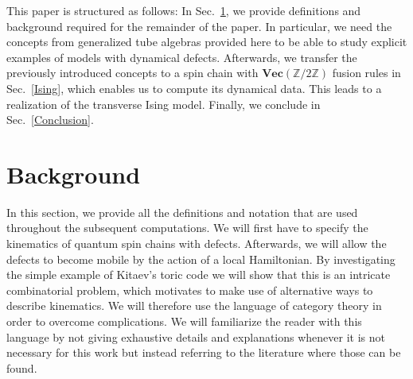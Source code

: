 \documentclass[aps,prb,twocolumn,superscriptaddress,noshowkeys]{revtex4-2}  %
\renewcommand{\Vec}{\textbf{Vec}}
\newcommand{\Z}{\mathbb{Z}}
\theoremstyle{plain}%
\theoremstyle{definition}
\theoremstyle{remark}
\begin{document}

This paper is structured as follows: In Sec.~\ref{S:defs}, we provide definitions and background required for the remainder of the paper. In particular, we need the concepts from generalized tube algebras provided here to be able to study explicit examples of models with dynamical defects. Afterwards, we transfer the previously introduced concepts to a spin chain with $\Vec(\Z/2\Z)$ fusion rules in Sec.~\ref{Ising}, which enables us to compute its dynamical data. This leads to a realization of the transverse Ising model. Finally, we conclude in Sec.~\ref{Conclusion}.

\section{Background}\label{S:defs}
In this section, we provide all the definitions and notation that are used throughout the subsequent computations. We will first have to specify the kinematics of quantum spin chains with defects. Afterwards, we will allow the defects to become mobile by the action of a local Hamiltonian. By investigating the simple example of Kitaev's toric code \cite{Kit03} we will show that this is an intricate combinatorial problem, which motivates to make use of alternative ways to describe kinematics. We will therefore use the language of category theory in order to overcome complications. We will familiarize the reader with this language by not giving exhaustive details and explanations whenever it is not necessary for this work but instead referring to the literature where those can be found.
\end{document}
